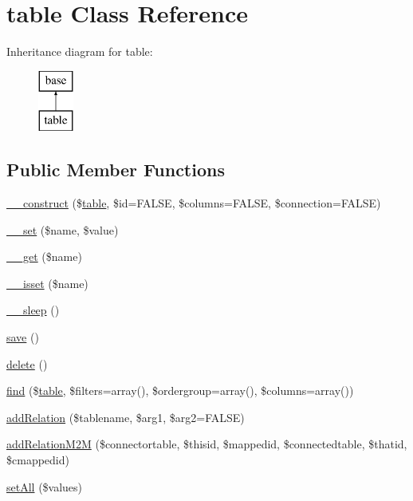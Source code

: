 \hypertarget{classtable}{
\section{table Class Reference}
\label{classtable}
}
Inheritance diagram for table:\begin{figure}[H]
\begin{center}
\leavevmode
\includegraphics[height=2.000000cm]{classtable}
\end{center}
\end{figure}
\subsection*{Public Member Functions}
\begin{DoxyCompactItemize}
\item 
\hyperlink{classtable_adb8d24f1376e0b2c5f31deb281c76385}{\_\-\_\-construct} (\$\hyperlink{classtable}{table}, \$id=FALSE, \$columns=FALSE, \$connection=FALSE)
\item 
\hyperlink{classtable_a83c2703c91959192f759992ad5640b67}{\_\-\_\-set} (\$name, \$value)
\item 
\hyperlink{classtable_abc8e9e31bb15c8a44c3210ec551407c8}{\_\-\_\-get} (\$name)
\item 
\hyperlink{classtable_a8f132f051b7cd7d570ccb9f6e2bb4201}{\_\-\_\-isset} (\$name)
\item 
\hyperlink{classtable_aaf11785905da71774e052912d784e3b4}{\_\-\_\-sleep} ()
\item 
\hyperlink{classtable_afc8a3c62679cf00ade9f15fb2a6d6132}{save} ()
\item 
\hyperlink{classtable_a13bdffdd926f26b825ea57066334ff01}{delete} ()
\item 
\hyperlink{classtable_a144f2a49e9970315392c13525d5de652}{find} (\$\hyperlink{classtable}{table}, \$filters=array(), \$ordergroup=array(), \$columns=array())
\item 
\hyperlink{classtable_aa86daa58bc1ff877f2137c27b222dff6}{addRelation} (\$tablename, \$arg1, \$arg2=FALSE)
\item 
\hyperlink{classtable_a29c2012e7cc6b182cc3ca63acfc324b9}{addRelationM2M} (\$connectortable, \$thisid, \$mappedid, \$connectedtable, \$thatid, \$cmappedid)
\item 
\hyperlink{classtable_ac228d1f699104433c0f2679dd2dacdaf}{setAll} (\$values)
\end{DoxyCompactItemize}
